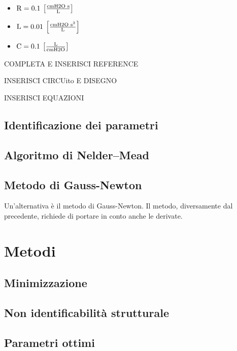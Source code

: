 \begin{itemize}
	\item $\operatorname{R}=0.1  \:\left[\text{cmH2O s}\over \text{L} \right]$
	\item $\operatorname{L}=0.01 \:\left[\text{cmH2O s}^2\over \text{L} \right]$
	
	\item $\operatorname{C}=0.1 \:\left[\text{L}\over \text{cmH2O} \right]$
\end{itemize}

COMPLETA E INSERISCI REFERENCE 

INSERISCI CIRCUito E DISEGNO 

INSERISCI EQUAZIONI

\subsection{Identificazione dei parametri}
\lipsum[1-2]



\subsection{Algoritmo di Nelder–Mead}



\lipsum[1-5]
\subsection{Metodo di Gauss-Newton}

Un'alternativa è il metodo di Gauss-Newton. Il metodo, diversamente dal precedente, richiede di portare in conto anche le derivate. 



\lipsum[1-5]

\section{Metodi}

\subsection{Minimizzazione}

\subsection{Non identificabilità strutturale}

\subsection{Parametri ottimi}

